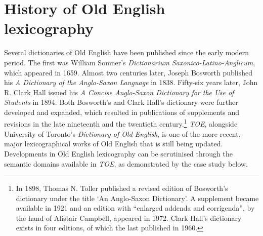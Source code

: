 \section{History of Old English lexicography}
\label{sect:Stolk2021x:cs-lexicog}

Several dictionaries of Old English have been published since the early modern period. The first was William Somner's \textit{Dictionarium Saxonico-Latino-Anglicum}, which appeared in 1659. Almost two centuries later, Joseph Bosworth published his \textit{A Dictionary of the Anglo-Saxon Language} in 1838. Fifty-six years later, John R. Clark Hall issued his \textit{A Concise Anglo-Saxon Dictionary for the Use of Students} in 1894. Both Bosworth's and Clark Hall's dictionary were further developed and expanded, which resulted in publications of supplements and revisions in the late nineteenth and the twentieth century.\footnote{In 1898, Thomas N. Toller published a revised edition of Bosworth's dictionary under the title `An Anglo-Saxon Dictionary'. A supplement became available in 1921 and an edition with ``enlarged addenda and corrigenda'', by the hand of Alistair Campbell, appeared in 1972. Clark Hall's dictionary exists in four editions, of which the last published in 1960.} 
\textit{TOE}, alongside University of Toronto's \textit{Dictionary of Old English}, is one of the more recent, major lexicographical works of Old English that is still being updated. %
Developments in Old English lexicography can be scrutinised through the semantic domains available in \textit{TOE}, as demonstrated by the case study below.


